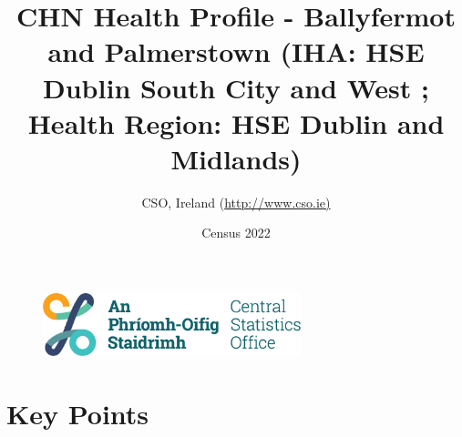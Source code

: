 \documentclass{article}
\title{CHN Health Profile - Ballyfermot and Palmerstown (IHA: HSE Dublin South City and West ;  Health Region: HSE Dublin and Midlands) }
\date{Census 2022}
\author{CSO, Ireland  (\url{http://www.cso.ie)}}
\begin{document}


\begin{figure}
	\centering
\includegraphics[width =75mm]{../figures/CSO_Logo.png}
\end{figure}

				 
		   
						  
														  
																																													
												 
			 
\maketitle
					
													   
				 
						 
																																																																											   
				 
				  
  \pagebreak
    	    \tableofcontents

\pagebreak


\section{Key Points}
\end{document}
